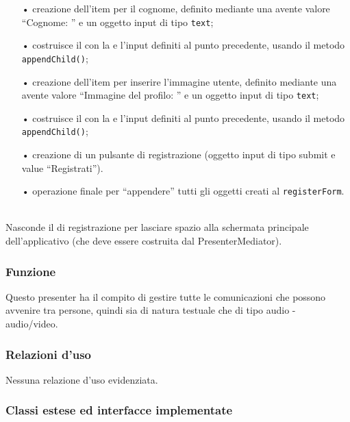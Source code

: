 \begin{description}
\begin{itemize}
		\item[•] creazione dell'item per il cognome, definito mediante una  avente valore ``Cognome: '' e un oggetto input di tipo \texttt{text};
		\item[•] costruisce il  con la  e l'input definiti al punto precedente, usando il metodo \texttt{appendChild()};
		\item[•] creazione dell'item per inserire l'immagine utente, definito mediante una  avente valore ``Immagine del profilo: '' e un oggetto input di tipo \texttt{text};
		\item[•] costruisce il  con la  e l'input definiti al punto precedente, usando il metodo \texttt{appendChild()};
		\item[•] creazione di un pulsante di registrazione (oggetto input di tipo submit e value ``Registrati'').
		\item[•] operazione finale per ``appendere'' tutti  gli oggetti creati al \texttt{registerForm}.
	\end{itemize}
	
	\item{}\\
	Nasconde il  di registrazione per lasciare spazio alla schermata principale dell'applicativo (che deve essere costruita dal PresenterMediator).

\end{description}


\subsubsection*{Funzione}
Questo presenter ha il compito di gestire tutte le comunicazioni che possono avvenire tra persone, quindi sia di natura testuale che di tipo audio - audio/video.

\subsubsection*{Relazioni d'uso}
Nessuna relazione d'uso evidenziata.

\subsubsection*{Classi estese ed interfacce implementate}

